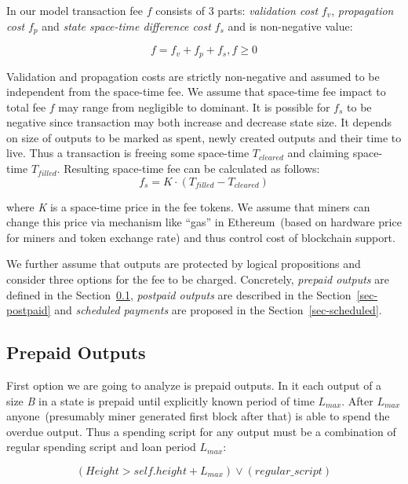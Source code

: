 \documentclass[]{article}   %
\begin{document}
In our model transaction fee $f$ consists of 3 parts: \textit{validation cost} $f_v$, \textit{propagation cost} $f_p$ and \textit{state space-time difference cost} $f_s$ and is non-negative value:

\begin{equation}
f = f_v + f_p + f_s , f \ge 0
\end{equation}

Validation and propagation costs are strictly non-negative and assumed to be independent from the space-time fee. We assume that space-time fee impact to total fee $f$ may range from negligible to dominant. It is possible for $f_s$ to be negative since transaction may both increase and decrease state size. It depends on size of outputs to be marked as spent, newly created outputs and their time to live. Thus a transaction is freeing some space-time \textit{$T_{cleared}$} and claiming space-time \textit{$T_{filled}$}. Resulting space-time fee can be calculated as follows:
\begin{equation}
f_s = K \cdot (T_{filled} - T_{cleared})
\end{equation}

where \textit{K} is a space-time price in the fee tokens. We assume that miners can change this price via mechanism like ``gas'' in Ethereum~(based on hardware price for miners and token exchange rate) and thus control cost of blockchain support.

We further assume that outputs are protected by logical propositions and consider three options for the fee to be charged. Concretely, \textit{prepaid outputs} are defined in the Section~\ref{sec-prepaid}, \textit{postpaid outputs} are described in the Section~\ref{sec-postpaid} and \textit{scheduled payments} are proposed in the Section~\ref{sec-scheduled}.

\subsection{Prepaid Outputs}
\label{sec-prepaid}

First option we are going to analyze is prepaid outputs. In it each output of a size \textit{B} in a state is prepaid until explicitly known period of time $L_{max}$. After $L_{max}$ anyone~(presumably miner generated first block after that) is able to spend the overdue output. Thus a spending script for any output must be a combination of regular spending script and loan period $L_{max}$:

\begin{equation}
(Height > self.height + L_{max}) \lor (regular\_script)
\end{equation}
\end{document}
